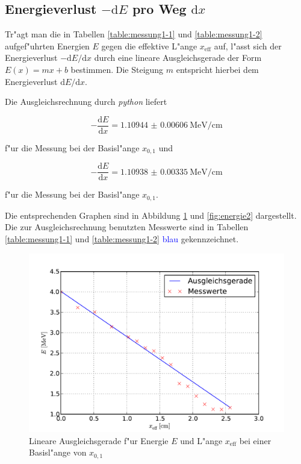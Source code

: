 		\clearpage

	\subsection{Energieverlust $-\mathrm{d}E$ pro Weg $\mathrm{d}x$}
	\label{subsec:energieverlust}
		Tr"agt man die in Tabellen \ref{table:messung1-1} und \ref{table:messung1-2} aufgef"uhrten Energien $E$ gegen die effektive L"ange $x_\mathrm{eff}$ auf, l"asst sich der Energieverlust $-\mathrm{d}E / \mathrm{d}x$ durch eine lineare Ausgleichsgerade der Form $E(x) = mx + b$ bestimmen.
		Die Steigung $m$ entspricht hierbei dem Energieverlust $\mathrm{d}E / \mathrm{d}x$.

		Die Ausgleichsrechnung durch \emph{python} liefert

		\begin{equation*}
			-\frac{\mathrm{d}E}{\mathrm{d}x} = \SI{1.10944(606)}{\mega \electronvolt \per \centi \meter}
		\end{equation*}

		f"ur die Messung bei der Basisl"ange $x_{0,1}$ und

		\begin{equation*}
			-\frac{\mathrm{d}E}{\mathrm{d}x} = \SI{1.10938(335)}{\mega \electronvolt \per \centi \meter}
		\end{equation*}

		f"ur die Messung bei der Basisl"ange $x_{0,1}$.

		Die entsprechenden Graphen sind in Abbildung \ref{fig:energie1} und \ref{fig:energie2} dargestellt.
		Die zur Ausgleichsrechnung benutzten Messwerte sind in Tabellen \ref{table:messung1-1} und \ref{table:messung1-2} \textcolor{blue}{blau} gekennzeichnet.

		\begin{figure}[h]
			\centering
			\includegraphics[width = 13cm]{img/energie1.pdf}
			\caption{Lineare Ausgleichsgerade f"ur Energie $E$ und L"ange $x_\mathrm{eff}$ bei einer Basisl"ange von $x_{0,1}$ \label{fig:energie1}}
		\end{figure}

